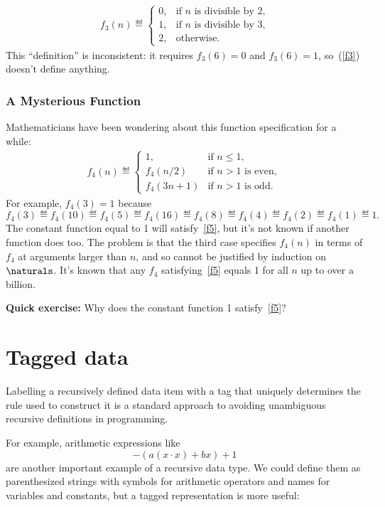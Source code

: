 \begin{definition}
\begin{eqnarray}\label{f3}
f_3(n) \eqdef \begin{cases}
  0, &  \text{if $n$ is divisible by 2,}\\
  1, &  \text{if $n$ is divisible by 3,}\\
  2, & \text{otherwise.}
 \end{cases}
\end{eqnarray}
This ``definition'' is inconsistent: it requires $f_3(6) = 0$ and $f_3(6)
=1$, so~(\ref{f3}) doesn't define anything.

\subsubsection{A Mysterious Function}
Mathematicians have been wondering about this function specification for a
while:
\begin{eqnarray}\label{f5}
f_4(n) \eqdef\begin{cases}
 1, & \text{if $n\le 1$},\\
 f_4(n/2) &  \text{if $n>1$ is even},\\
 f_4(3n+1)& \text{if $n>1$ is odd}.
\end{cases}
\end{eqnarray}
For example, $f_4(3)=1$ because
\[
f_4(3)\eqdef f_4(10)\eqdef f_4(5)\eqdef f_4(16)\eqdef f_4(8)\eqdef
f_4(4)\eqdef f_4(2)\eqdef f_4(1)\eqdef 1.
\]
The constant function equal to 1 will satisfy~\eqref{f5}, but it's not
known if another function does too.  The problem is that the third case
specifies $f_4(n)$ in terms of $f_4$ at arguments larger than $n$, and so
cannot be justified by induction on $\naturals$.  It's known that any
$f_4$ satisfying~\eqref{f5} equals 1 for all $n$ up to over a billion.

\textbf{Quick exercise:} Why does the constant function 1
satisfy~\eqref{f5}?

\iffalse

\section{Tagged data}

Labelling a recursively defined data item with a tag that uniquely
determines the rule used to construct it is a standard approach to avoiding
unambiguous recursive definitions in programming.

For example, arithmetic expressions like
\begin{equation}\label{ax}
-(a(x\cdot x)+ bx) + 1
\end{equation}
are another important example of a recursive data type.  We could define
them as parenthesized strings with symbols for arithmetic operators and
names for variables and constants, but a tagged representation is more
useful:


\end{definition}
